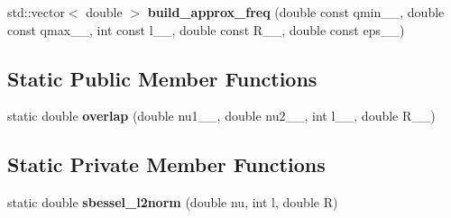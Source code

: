 \begin{DoxyCompactItemize}
\item 
\hypertarget{classsirius_1_1_spherical___bessel__approximant_ac4d44d8150b253743b6d740525502a34}{}std\+::vector$<$ double $>$ {\bfseries build\+\_\+approx\+\_\+freq} (double const qmin\+\_\+\+\_\+, double const qmax\+\_\+\+\_\+, int const l\+\_\+\+\_\+, double const R\+\_\+\+\_\+, double const eps\+\_\+\+\_\+)\label{classsirius_1_1_spherical___bessel__approximant_ac4d44d8150b253743b6d740525502a34}

\end{DoxyCompactItemize}
\subsection*{Static Public Member Functions}
\begin{DoxyCompactItemize}
\item 
\hypertarget{classsirius_1_1_spherical___bessel__approximant_ad33c7f39a2232301014e33a4d25c6a1c}{}static double {\bfseries overlap} (double nu1\+\_\+\+\_\+, double nu2\+\_\+\+\_\+, int l\+\_\+\+\_\+, double R\+\_\+\+\_\+)\label{classsirius_1_1_spherical___bessel__approximant_ad33c7f39a2232301014e33a4d25c6a1c}

\end{DoxyCompactItemize}
\subsection*{Static Private Member Functions}
\begin{DoxyCompactItemize}
\item 
\hypertarget{classsirius_1_1_spherical___bessel__approximant_afee7faecc7e535897085aa926f6b019b}{}static double {\bfseries sbessel\+\_\+l2norm} (double nu, int l, double R)\label{classsirius_1_1_spherical___bessel__approximant_afee7faecc7e535897085aa926f6b019b}

\end{DoxyCompactItemize}
